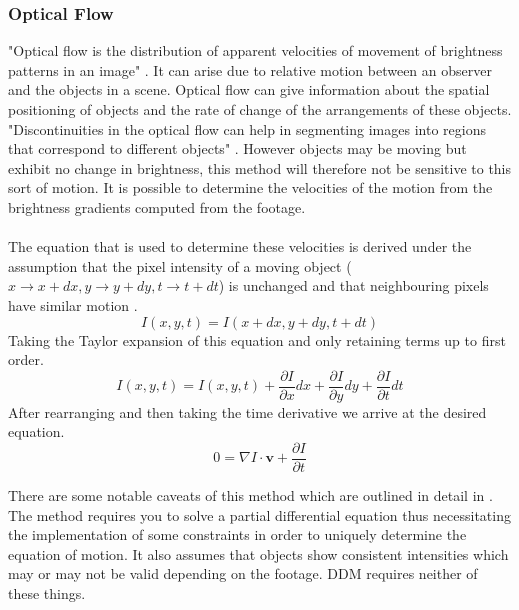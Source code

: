 \documentclass[10pt]{article}
\begin{document}
\subsubsection{Optical Flow}
"Optical flow is the distribution of apparent velocities of movement of brightness patterns in an image" \cite{optical_flow}. It can arise due to relative motion between an observer and the objects in a scene. Optical flow can give information about the spatial positioning of objects and the rate of change of the arrangements of these objects. "Discontinuities in the optical flow can help in segmenting images into regions that correspond to different objects" \cite{optical_flow}. However objects may be moving but exhibit no change in brightness, this method will therefore not be sensitive to this sort of motion. It is possible to determine the velocities of the motion from the brightness gradients computed from the footage.
\\\\
The equation that is used to determine these velocities is derived under the assumption that the pixel intensity of a moving object ($x \rightarrow x + dx, y \rightarrow y + dy, t \rightarrow t + dt $) is unchanged and that neighbouring pixels have similar motion \cite{optical_flow_opencv}.
\begin{equation}
I(x, y, t) = I(x + dx, y + dy, t + dt)
\end{equation}
Taking the Taylor expansion of this equation and only retaining terms up to first order.
\begin{equation}
I(x, y, t) = I(x, y, t) + \frac{\partial I}{\partial x} dx + \frac{\partial I}{\partial y} dy + \frac{\partial I}{\partial t} dt
\end{equation}
After rearranging and then taking the time derivative we arrive at the desired equation.
\begin{equation}
0 = \nabla I \cdot \textbf{v} + \frac{\partial I}{\partial t}
\end{equation}
 
There are some notable caveats of this method which are outlined in detail in \cite{optical_flow}. The method requires you to solve a partial differential equation thus necessitating the implementation of some constraints in order to uniquely determine the equation of motion. It also assumes that objects show consistent intensities which may or may not be valid depending on the footage. DDM requires neither of these things.
\end{document}
